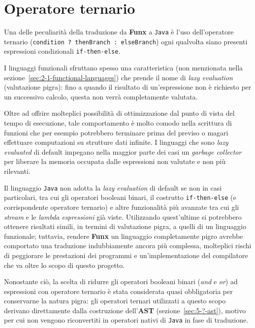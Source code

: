 \section{Operatore ternario}
\label{sec:4-2-ternary-operator}

Una delle peculiarità della traduzione da \textbf{Funx} a \texttt{Java} è l'uso dell'operatore ternario
(\texttt{condition ? thenBranch : elseBranch}) ogni qualvolta
siano presenti espressioni condizionali \texttt{if-then-else}.

I linguaggi funzionali sfruttano spesso una caratteristica (non menzionata nella sezione~\ref{sec:2-1-functional-languages})
che prende il nome di \textit{lazy evaluation} (valutazione pigra): fino a quando il risultato di un'espressione
non è richiesto per un successivo calcolo, questa non verrà completamente valutata.

\noindent Oltre ad offrire molteplici possibilità di ottimizzazione dal punto di vista del tempo di esecuzione,
tale comportamento è molto comodo nella scrittura di funzioni che per esempio potrebbero terminare
prima del previso o magari effettuare computazioni su strutture dati infinite.
I linguaggi che sono \textit{lazy evaluated} di default impegano nella maggior parte dei casi un \textit{garbage collector}
per liberare la memoria occupata dalle espressioni non valutate e non più rilevanti.

Il linguaggio \texttt{Java} non adotta la \textit{lazy evaluation} di default se non in casi particolari, tra cui
gli operatori booleani binari, il costrutto \texttt{if-then-else} (e corrispondente operatore ternario) e altre
funzionalità più avanzate tra cui gli \textit{stream} e le \textit{lambda espressioni} già viste.
Utilizzando quest'ultime si potrebbero ottenere risultati simili, in termini di valutazione pigra, a quelli di un linguaggio funzionale;
tuttavia, rendere \textbf{Funx} un linguaggio completamente pigro avrebbe comportato una traduzione indubbiamente ancora più complessa,
molteplici rischi di peggiorare le prestazioni dei programmi e un'implementazione del compilatore che va oltre lo scopo di questo progetto.

Nonostante ciò, la scelta di ridurre gli operatori booleani binari (\textit{and} e \textit{or}) ad espressioni con operatore ternario
è stata considerata quasi obbligatoria per conservarne la natura pigra: gli operatori ternari utilizzati a questo scopo
derivano direttamente dalla costruzione dell'\textbf{AST} (sezione~\ref{sec:5-?-ast}), motivo per cui non vengono riconvertiti
in operatori nativi di \texttt{Java} in fase di traduzione.

